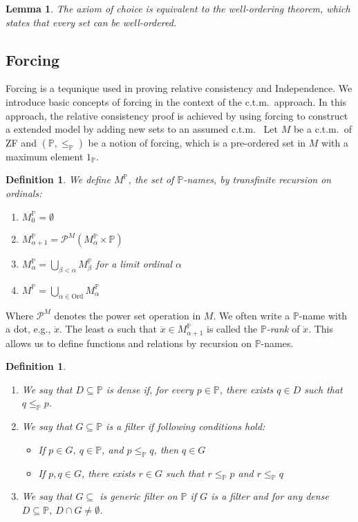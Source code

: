 \documentclass{report}
\newtheorem{lem}[thm]{Lemma}
\newtheorem{dfn}[thm]{Definition}
\newcommand{\Pbb}{\mathbb{P}}
\newcommand{\ctm}{c.t.m.\ }
\begin{document}
\begin{lem}
  The axiom of choice is equivalent to the well-ordering theorem, which states that every set can be well-ordered.
\end{lem}

\subsection{Forcing}
Forcing is a tequnique used in proving relative consistency and Independence.
We introduce basic concepts of forcing in the context of the \ctm approach.
In this approach, the relative consistency proof is achieved by using forcing to construct a extended model by adding new sets to an assumed \ctm
Let $M$ be a \ctm of ZF and $(\Pbb, \leq_{\Pbb})$ be a notion of forcing, which is a pre-ordered set in $M$ with a maximum element $1_{\Pbb}$.

\begin{dfn}
  We define $M^{\Pbb}$, the set of \emph{$\Pbb$-names}, by transfinite recursion on ordinals:
  \begin{enumerate}
    \item $M^{\Pbb}_0 = \emptyset$
    \item $M^{\Pbb}_{\alpha + 1} = \mathcal{P}^M(M^{\Pbb}_{\alpha} \times \Pbb)$
    \item $M^{\Pbb}_{\alpha} = \bigcup_{\beta < \alpha} M^{\Pbb}_{\beta}$ for a limit ordinal $\alpha$
    \item $M^{\Pbb} = \bigcup_{\alpha \in \mathrm{Ord}} M^{\Pbb}_{\alpha}$
  \end{enumerate}
\end{dfn}
Where $\mathcal{P}^M$ denotes the power set operation in $M$. 
We often write a $\Pbb$-name with a dot, e.g., $\dot{x}$.
The least $\alpha$ such that $\dot{x} \in M^{\Pbb}_{\alpha + 1}$ is called the \emph{$\Pbb$-rank} of $\dot{x}$.
This allows us to define functions and relations by recursion on $\Pbb$-names.

\begin{dfn} %
  \,
  \begin{enumerate}
    \item We say that $D \subseteq \Pbb$ is \emph{dense} if, for every $p \in \Pbb$, there exists $q \in D$ such that $q \leq_{\Pbb} p$.
    \item We say that $G \subseteq \Pbb$ is a \emph{filter} if following conditions hold:
      \begin{itemize}
        \item If $p \in G$, $q \in \Pbb$, and $p \leq_{\Pbb} q$, then $q \in G$
        \item If $p, q \in G$, there exists $r \in G$ such that $r \leq_{\Pbb} p$ and $r \leq_{\Pbb} q$
      \end{itemize}
    \item We say that $G \subseteq$ is \emph{generic filter} on $\Pbb$ if $G$ is a filter and for any dense $D \subseteq \Pbb$, $D \cap G \neq \emptyset$.
  \end{enumerate}
\end{dfn}
\end{document}
